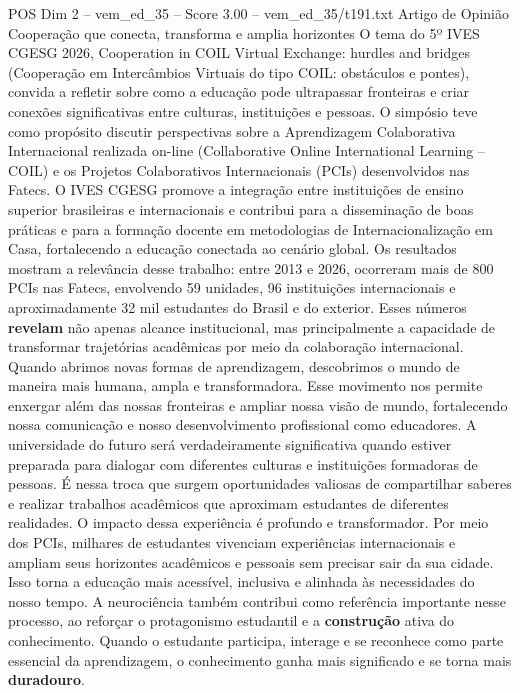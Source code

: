\begin{textsample}{POS Dim 2 – vem\_ed\_35 – Score 3.00 – vem\_ed\_35/t191.txt}  \label{ex:f2_pos_002}
Artigo de Opinião Cooperação que conecta, transforma e amplia horizontes O tema do 5º IVES CGESG 2026, Cooperation in COIL Virtual Exchange: hurdles and bridges (Cooperação em Intercâmbios Virtuais do tipo COIL: obstáculos e pontes), convida a refletir sobre como a educação pode ultrapassar fronteiras e criar conexões significativas entre culturas, instituições e pessoas.
O simpósio teve como propósito discutir perspectivas sobre a Aprendizagem Colaborativa Internacional realizada on-line (Collaborative Online International Learning – COIL) e os Projetos Colaborativos Internacionais (PCIs) desenvolvidos nas Fatecs.
O IVES CGESG promove a integração entre instituições de ensino superior brasileiras e internacionais e contribui para a disseminação de boas práticas e para a formação docente em metodologias de Internacionalização em Casa, fortalecendo a educação conectada ao cenário global.
Os resultados mostram a relevância desse trabalho: entre 2013 e 2026, ocorreram mais de 800 PCIs nas Fatecs, envolvendo 59 unidades, 96 instituições internacionais e aproximadamente 32 mil estudantes do Brasil e do exterior.
Esses números \textbf{revelam} não apenas alcance institucional, mas principalmente a capacidade de transformar trajetórias acadêmicas por meio da colaboração internacional.
Quando abrimos novas formas de aprendizagem, descobrimos o mundo de maneira mais humana, ampla e transformadora.
Esse movimento nos permite enxergar além das nossas fronteiras e ampliar nossa visão de mundo, fortalecendo nossa comunicação e nosso desenvolvimento profissional como educadores.
A universidade do futuro será verdadeiramente significativa quando estiver preparada para dialogar com diferentes culturas e instituições formadoras de pessoas.
É nessa troca que surgem oportunidades valiosas de compartilhar saberes e realizar trabalhos acadêmicos que aproximam estudantes de diferentes realidades.
O impacto dessa experiência é profundo e transformador.
Por meio dos PCIs, milhares de estudantes vivenciam experiências internacionais e ampliam seus horizontes acadêmicos e pessoais sem precisar sair da sua cidade.
Isso torna a educação mais acessível, inclusiva e alinhada às necessidades do nosso tempo.
A neurociência também contribui como referência importante nesse processo, ao reforçar o protagonismo estudantil e a \textbf{construção} ativa do conhecimento.
Quando o estudante participa, interage e se reconhece como parte essencial da aprendizagem, o conhecimento ganha mais significado e se torna mais \textbf{duradouro}.

\end{textsample}
